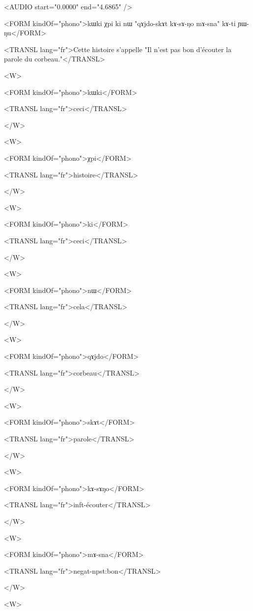 \documentclass[oldfontcommands,oneside,a4paper,11pt]{memoir}
\begin{document}
 
    <AUDIO start="0.0000" end="4.6865" />
    
    
    <FORM kindOf="phono">kɯki χpi ki nɯ "qɤjdo-skɤt  kɤ-sɤ-ŋo mɤ-sna" kɤ-ti ɲɯ-ŋu</FORM>
    
    
    <TRANSL lang="fr">Cette histoire s'appelle "Il n'est pas bon d'écouter la parole du corbeau."</TRANSL>
    
    
    <W>
    
    
      <FORM kindOf="phono">kɯki</FORM>
      
      
      <TRANSL lang="fr">ceci</TRANSL>
      
      
    </W>
    
    
    <W>
    
    
      <FORM kindOf="phono">χpi</FORM>
      
      
      <TRANSL lang="fr">histoire</TRANSL>
      
      
    </W>
    
    
    <W>


      <FORM kindOf="phono">ki</FORM>


      <TRANSL lang="fr">ceci</TRANSL>


    </W>


    <W>


      <FORM kindOf="phono">nɯ</FORM>


      <TRANSL lang="fr">cela</TRANSL>


    </W>


    <W>


      <FORM kindOf="phono">qɤjdo</FORM>


      <TRANSL lang="fr">corbeau</TRANSL>


    </W>


    <W>


      <FORM kindOf="phono">skɤt</FORM>


      <TRANSL lang="fr">parole</TRANSL>


    </W>


    <W>


      <FORM kindOf="phono">kɤ-sɤŋo</FORM>


      <TRANSL lang="fr">inft-écouter</TRANSL>


    </W>


    <W>


      <FORM kindOf="phono">mɤ-sna</FORM>


      <TRANSL lang="fr">negat-npst:bon</TRANSL>


    </W>


    <W>
\end{document}
